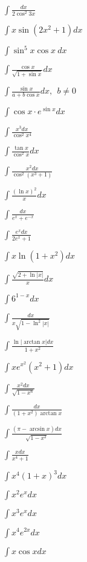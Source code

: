 \begin{multicols}{2}
$\displaystyle \int \frac{dx}{2\cos^2 3x}$

$\displaystyle \int x\sin(2x^2+1)dx$

$\displaystyle \int \sin^5x\cos x \ dx$

$\displaystyle \int \frac{\cos x}{\sqrt{1+\sin x}}dx$

$\displaystyle \int \frac{\sin x}{a+b\cos x}dx, \ \ b\neq 0$

$\displaystyle \int \cos x \cdot e^{\sin x}dx$

$\displaystyle \int \frac{x^3dx}{\cos^2 x^4}$

$\displaystyle \int \frac{\tan x}{\cos^2 x}dx$

$\displaystyle \int \frac{x^2dx}{\cos^2(x^3+1)}$

$\displaystyle \int \frac{(\ln x)^2}{x}dx$

$\displaystyle \int \frac{dx}{e^x+e^{-x}}$

$\displaystyle \int \frac{e^xdx}{2e^x+1}$

$\displaystyle \int x\ln(1+x^2)dx$

$\displaystyle \int \frac{\sqrt{2+\ln|x|}}{x}dx$

$\displaystyle \int 6^{1-x}dx$

$\displaystyle \int \frac{dx}{x\sqrt{1-\ln^2|x|}}$

$\displaystyle \int \frac{\ln|\arctan x|dx}{1+x^2}$

$\displaystyle \int xe^{x^2}(x^2+1)dx$

$\displaystyle \int \frac{x^2dx}{\sqrt{1-x^6}}$

$\displaystyle \int \frac{dx}{(1+x^2)\arctan x}$

$\displaystyle \int \frac{(\pi -\arcsin x)dx}{\sqrt{1-x^2}}$

$\displaystyle \int \frac{xdx}{x^4+1}$

$\displaystyle \int x^4(1+x)^3dx$

$\displaystyle \int x^2e^xdx$

$\displaystyle \int x^3e^x dx$

$\displaystyle \int x^4e^{2x} dx$

$\displaystyle \int x\cos x dx$


\end{multicols}
